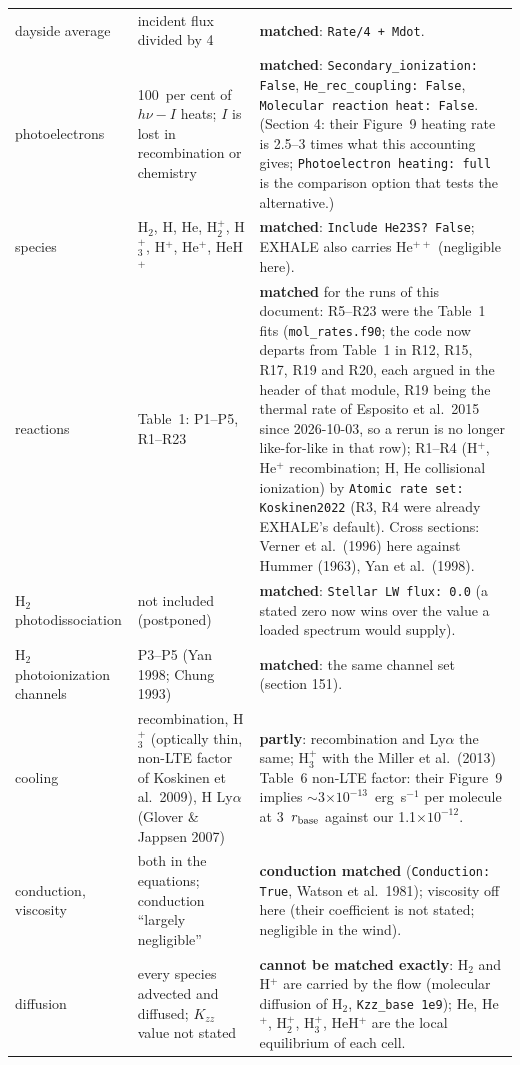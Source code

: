 \documentclass[english,a4paper]{my_memo}
\begin{document}
{\begin{longtable}{@{}p{3.1cm}p{4.5cm}p{6.6cm}@{}}
dayside average & incident flux divided by 4 & \textbf{matched}: \texttt{Rate/4 + Mdot}. \\
photoelectrons & 100~per cent of $h\nu - I$ heats; $I$ is lost in recombination or chemistry & \textbf{matched}: \texttt{Secondary\_ionization: False}, \texttt{He\_rec\_coupling: False}, \texttt{Molecular reaction heat: False}. (Section 4: their Figure~9 heating rate is 2.5--3 times what this accounting gives; \texttt{Photoelectron heating: full} is the comparison option that tests the alternative.) \\
species & H$_2$, H, He, H$_2^+$, H$_3^+$, H$^+$, He$^+$, HeH$^+$ & \textbf{matched}: \texttt{Include He23S? False}; EXHALE also carries He$^{++}$ (negligible here). \\
reactions & Table~1: P1--P5, R1--R23 & \textbf{matched} for the runs of this document: R5--R23 were the Table~1 fits (\texttt{mol\_rates.f90}; the code now departs from Table~1 in R12, R15, R17, R19 and R20, each argued in the header of that module, R19 being the thermal rate of Esposito et al.\ 2015 since 2026-10-03, so a rerun is no longer like-for-like in that row); R1--R4 (H$^+$, He$^+$ recombination; H, He collisional ionization) by \texttt{Atomic rate set: Koskinen2022} (R3, R4 were already EXHALE's default). Cross sections: Verner et al.\ (1996) here against Hummer (1963), Yan et al.\ (1998). \\
H$_2$ photodissociation & not included (postponed) & \textbf{matched}: \texttt{Stellar LW flux: 0.0} (a stated zero now wins over the value a loaded spectrum would supply). \\
H$_2$ photoionization channels & P3--P5 (Yan 1998; Chung 1993) & \textbf{matched}: the same channel set (section 151). \\
cooling & recombination, H$_3^+$ (optically thin, non-LTE factor of Koskinen et al.\ 2009), H Ly$\alpha$ (Glover \& Jappsen 2007) & \textbf{partly}: recombination and Ly$\alpha$ the same; H$_3^+$ with the Miller et al.\ (2013) Table~6 non-LTE factor: their Figure~9 implies $\sim$3$\times10^{-13}$~erg~s$^{-1}$ per molecule at 3~$r_{\rm base}$ against our 1.1$\times10^{-12}$. \\
conduction, viscosity & both in the equations; conduction ``largely negligible'' & \textbf{conduction matched} (\texttt{Conduction: True}, Watson et al.\ 1981); viscosity off here (their coefficient is not stated; negligible in the wind). \\
diffusion & every species advected and diffused; $K_{zz}$ value not stated & \textbf{cannot be matched exactly}: H$_2$ and H$^+$ are carried by the flow (molecular diffusion of H$_2$, \texttt{Kzz\_base 1e9}); He, He$^+$, H$_2^+$, H$_3^+$, HeH$^+$ are the local equilibrium of each cell. \\

\end{longtable}}
\end{document}
